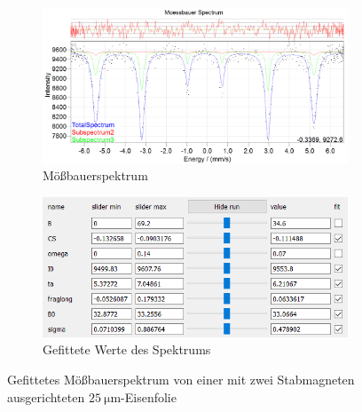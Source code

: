 \documentclass[german, %
parskip=full, %
bibliography=totoc, %
]{scrartcl}
\begin{document}
\begin{figure}[ht]
	\centering
	\begin{subfigure}[b]{0.5\textwidth}
		\includegraphics[width=\textwidth]{MoessbauerEisen25MagnetGerade}
	  \caption{Mößbauerspektrum}
	  \label{fig:moess25gerade}
  \end{subfigure}
  \begin{subfigure}[b]{0.4\textwidth}
	  \includegraphics[width=\textwidth]{WerteEisen25MagnetGerade}
	  \caption{Gefittete Werte des Spektrums}
	  \label{fig:werte25gerade}
  \end{subfigure}
	\caption{Gefittetes Mößbauerspektrum von einer mit zwei Stabmagneten ausgerichteten \(\SI{25}{\micro\meter}\)-Eisenfolie}
\end{figure}
\end{document}
